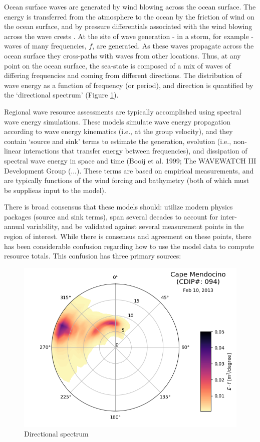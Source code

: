 \documentclass[authoryear,preprint]{elsarticle}
\begin{document}
Ocean surface waves are generated by wind blowing across the ocean surface. The energy is transferred from the atmosphere to the ocean by the friction of wind on the ocean surface, and by pressure differentials associated with the wind blowing across the wave crests \citep[]{phillipsDynamicsUpperOcean1980,youngWindGeneratedOcean1999}. At the site of wave generation - in a storm, for example - waves of many frequencies, $f$, are generated. As these waves propagate across the ocean surface they cross-paths with waves from other locations. Thus, at any point on the ocean surface, the sea-state is composed of a mix of waves of differing frequencies and coming from different directions. The distribution of wave energy as a function of frequency (or period), and direction is quantified by the ‘directional spectrum’ (Figure \ref{fig:dirspec}).

Regional wave resource assessments are typically accomplished using spectral wave energy simulations. These models simulate wave energy propagation according to wave energy kinematics (i.e., at the group velocity), and they contain ‘source and sink’ terms to estimate the generation, evolution (i.e., non-linear interactions that transfer energy between frequencies), and dissipation of spectral wave energy in space and time (Booij et al. 1999; The WAVEWATCH III Development Group (...). These terms are based on empirical measurements, and are typically functions of the wind forcing and bathymetry (both of which must be supplieas input to the model).

There is broad consensus that these models should: utilize modern physics packages (source and sink terms), span several decades to account for inter-annual variability, and be validated against several measurement points in the region of interest. While there is consensus and agreement on these points, there has been considerable confusion regarding how to use the model data to compute resource totals. This confusion has three primary sources:


\begin{figure}[ht]
  \centering
  \includegraphics[width=0.9\linewidth]{../fig/dirspec.png}
  \caption{Directional spectrum}
  \label{fig:dirspec}
\end{figure}
\end{document}
